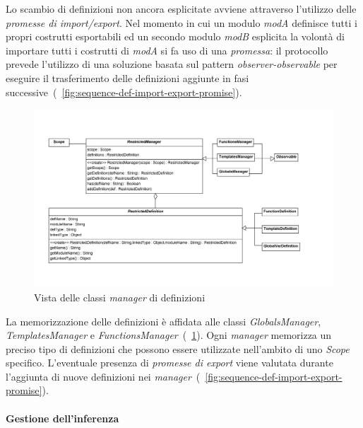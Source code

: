 Lo scambio di definizioni non ancora esplicitate avviene attraverso l'utilizzo delle \emph{promesse di import/export}. Nel momento in cui un modulo \emph{modA} definisce tutti i propri costrutti esportabili ed un secondo modulo \emph{modB} esplicita la volontà di importare tutti i costrutti di \emph{modA} si fa uso di una \emph{promessa}: il protocollo prevede l'utilizzo di una soluzione basata sul pattern \emph{observer-observable} per eseguire il trasferimento delle definizioni aggiunte in fasi successive~(\figurename~\ref{fig:sequence-def-import-export-promise}).
\pagebreak

\begin{figure}
\centering
\includegraphics[width=1.2\textwidth]{Immagini/Capitolo3/Classi/myclips_RestrictedManager.png}
\caption{Vista delle classi \emph{manager} di definizioni}\label{fig:class-myclips-restricted-manager}
\end{figure}

La memorizzazione delle definizioni è affidata alle classi \emph{GlobalsManager}, \emph{TemplatesManager} e \emph{FunctionsManager}~(\figurename~\ref{fig:class-myclips-restricted-manager}). 
Ogni \emph{manager} memorizza un preciso tipo di definizioni che possono essere utilizzate nell'ambito di uno \emph{Scope} specifico. L'eventuale presenza di \emph{promesse di export} viene valutata durante l'aggiunta di nuove definizioni nei \emph{manager}~(\figurename~\ref{fig:sequence-def-import-export-promise}).


\paragraph{Gestione dell'inferenza}

